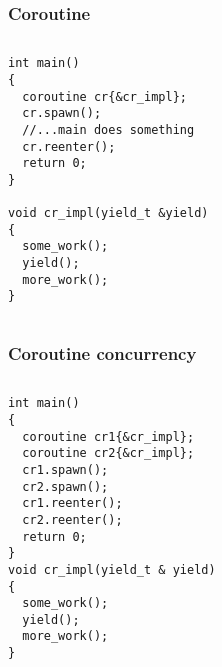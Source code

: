 \documentclass{beamer}
\begin{document}
\begin{frame}[fragile]
\frametitle{Coroutine}
\begin{columns}
\begin{column}{0.65\textwidth}
\vspace*{-3ex}
\begin{block}{\vspace*{-3.2ex}}
\begin{lstlisting}
int main()
{
  coroutine cr{&cr_impl};
  cr.spawn();
  //...main does something
  cr.reenter();
  return 0;
}

void cr_impl(yield_t &yield)
{
  some_work();
  yield();
  more_work();
}
\end{lstlisting}
\end{block}
\end{column}
\begin{column}{0.35\textwidth}
\begin{adjustbox}{max totalsize={.99\textwidth}{.99\textheight},center}

\end{adjustbox}
\end{column}
\end{columns}
\end{frame}

\begin{frame}[fragile]
\frametitle{Coroutine concurrency}
\begin{columns}
\begin{column}{0.60\textwidth}
\vspace*{-3ex}
\begin{block}{\vspace*{-3.2ex}}

\begin{lstlisting}[basicstyle=\small]
int main()
{
  coroutine cr1{&cr_impl};
  coroutine cr2{&cr_impl};
  cr1.spawn();
  cr2.spawn();
  cr1.reenter();
  cr2.reenter();
  return 0;
}
void cr_impl(yield_t & yield)
{
  some_work();
  yield();
  more_work();
}
\end{lstlisting}
\end{block}
\end{column}
\begin{column}{0.4\textwidth}

\begin{adjustbox}{max totalsize={.98\textwidth}{.98\textheight},center}

\end{adjustbox}
\end{column}
\end{columns}
\end{frame}
\end{document}
